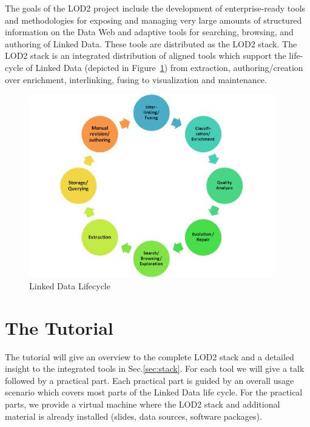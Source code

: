 \documentclass[a4paper, 11pt]{llncs}
\begin{document}
The goals of the LOD2 project include the development of enterprise-ready tools and methodologies for exposing and managing very large amounts of structured information on the Data Web and adaptive tools for searching, browsing, and authoring of Linked Data.
These tools are distributed as the LOD2 stack.
The LOD2 stack is an integrated distribution of aligned tools which support the life-cycle of Linked Data (depicted in Figure~\ref{fig:lifecycle}) from extraction, authoring/creation over enrichment, interlinking, fusing to visualization and maintenance.

\begin{figure}[t]
	\centering
		\includegraphics[width=0.95\textwidth]{lod-lifecycle-small}
	\caption{Linked Data Lifecycle}
	\label{fig:lifecycle}
\end{figure}

\section{The Tutorial}

    

The tutorial will give an overview to the complete LOD2 stack and a detailed insight to the integrated tools in Sec.\ref{sec:stack}.
For each tool we will give a talk followed by a practical part.
Each practical part is guided by an overall usage scenario which covers most parts of the Linked Data life cycle.
For the practical parts, we provide a virtual machine where the LOD2 stack and additional material is already installed (slides, data sources, software packages).
\end{document}

